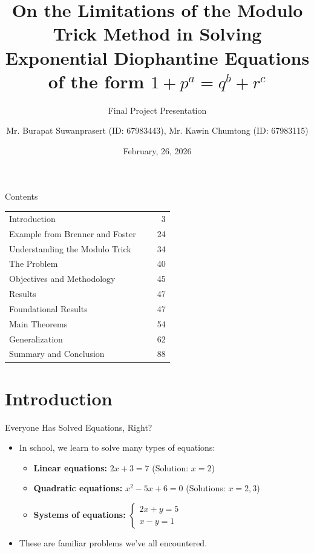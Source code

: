 ﻿\documentclass[10pt,aspectratio=169]{beamer}
\title{On the Limitations of the Modulo Trick Method in Solving Exponential Diophantine Equations of the form $1+p^a=q^b+r^c$}
\subtitle{Final Project Presentation}
\author[Burapat, Kawin]{%
  Mr. Burapat Suwanprasert (ID: 67983443), Mr. Kawin Chumtong (ID: 67983115) 
}
\institute{Assoc. Prof. Dr.Kijti Rodtes (Advisor)}
\date{February, 26, 2026}
\begin{document}
\maketitle

\begin{frame}{Contents}
    \small
    \begin{tabular}{@{}p{0.82\linewidth}r@{}}
        Introduction & 3 \\
        Example from Brenner and Foster & 24 \\
        Understanding the Modulo Trick & 34 \\
        The Problem & 40 \\
        Objectives and Methodology & 45 \\
        Results & 47 \\
        \hspace{1em}Foundational Results & 47 \\
        \hspace{1em}Main Theorems & 54 \\
        \hspace{1em}Generalization & 62 \\
        Summary and Conclusion & 88 \\
    \end{tabular}
\end{frame}

\section{Introduction}

\begin{frame}{Everyone Has Solved Equations, Right?}
    \begin{itemize}
        \item In school, we learn to solve many types of equations:
        \begin{itemize}
            \item \textbf{Linear equations:} $2x + 3 = 7$ \quad (Solution: $x = 2$)
            \item \textbf{Quadratic equations:} $x^2 - 5x + 6 = 0$ \quad (Solutions: $x = 2, 3$)
            \item \textbf{Systems of equations:} 
            $\begin{cases}
                2x + y = 5 \\
                x - y = 1
            \end{cases}$
        \end{itemize}
        \item These are familiar problems we've all encountered.
    \end{itemize}
\end{frame}
\end{document}
